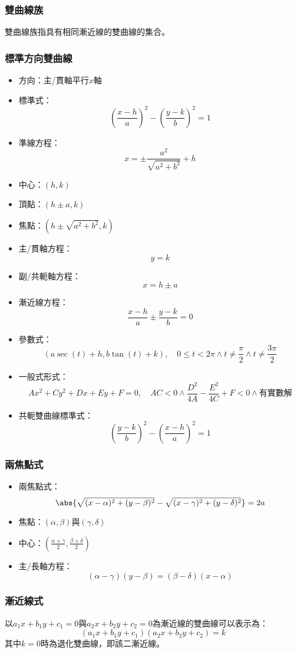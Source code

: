 \documentclass[a4paper,12pt]{article}
\begin{document}
\subsubsection{雙曲線族}
雙曲線族指具有相同漸近線的雙曲線的集合。
\subsubsection{標準方向雙曲線}
\begin{itemize}
\item 方向：主/貫軸平行$x$軸
\item 標準式：
\[\left(\frac{x-h}{a}\right)^2-\left(\frac{y-k}{b}\right)^2=1\]
\item 準線方程：
\[x=\pm\frac{a^2}{\sqrt{a^2+b^2}}+h\]
\item 中心：$(h,k)$
\item 頂點：$(h\pm a,k)$
\item 焦點：$(h\pm\sqrt{a^2+b^2},k)$
\item 主/貫軸方程：
\[y=k\]
\item 副/共軛軸方程：
\[x=h\pm a\]
\item 漸近線方程：
\[\frac{x-h}{a}\pm\frac{y-k}{b}=0\]
\item 參數式：
\[(a\sec(t)+h,b\tan(t)+k),\quad0\leq t<2\pi\land t\neq\frac{\pi}{2}\land t\neq\frac{3\pi}{2}\]
\item 一般式形式：
\[Ax^2+Cy^2+Dx+Ey+F=0,\quad AC<0\land\frac{D^2}{4A}-\frac{E^2}{4C}+F<0\land\text{有實數解}\]
\item 共軛雙曲線標準式：
\[\left(\frac{y-k}{b}\right)^2-\left(\frac{x-h}{a}\right)^2=1\]
\end{itemize}
\subsubsection{兩焦點式}
\begin{itemize}
\item 兩焦點式：
\[\abs{\sqrt{(x-\alpha)^2+(y-\beta)^2}-\sqrt{(x-\gamma)^2+(y-\delta)^2}}=2a\]
\item 焦點：$(\alpha,\beta)$與$(\gamma,\delta)$
\item 中心：$\left(\frac{\alpha+\gamma}{2},\frac{\beta+\delta}{2}\right)$
\item 主/長軸方程：
\[(\alpha-\gamma)(y-\beta)=(\beta-\delta)(x-\alpha)\]
\end{itemize}
\subsubsection{漸近線式}
以$a_1x+b_1y+c_1=0$與$a_2x+b_2y+c_2=0$為漸近線的雙曲線可以表示為：
\[(a_1x+b_1y+c_1)(a_2x+b_2y+c_2)=k\]
其中$k=0$時為退化雙曲線，即該二漸近線。
\end{document}
